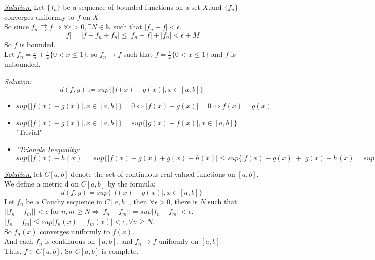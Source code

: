 \documentclass{book}
\begin{document}
\begin{tcolorbox}[enhanced,attach boxed title to top center={yshift=-3mm,yshifttext=-1mm},
colback=blue!5!white,colframe=blue!75!black,colbacktitle=red!80!black,
title=Exercise 60.5:,fonttitle=\bfseries,
boxed title style={size=small,colframe=red!50!black} ]
\textit{\color{blue}\underline{Solution:}}
Let $\{f_n\}$ be a sequence of bounded functions on a set $X$.and $\{f_n\}$
converges uniformly to $f$ on $X$\\
So since $f_n\rightrightarrows f\Rightarrow\forall\epsilon>0,\exists N\in\mathbb{N}$ such that $|f_n-f|<\epsilon$.\\
$$|f|=|f-f_n+f_n|\leq |f_n-f|+|f_n|<\epsilon+M$$
So $f$ is bounded.\\
\noindent{\color{black}\rule{\linewidth}{.3mm}}
Let $f_n=\frac{x}{n}+\frac{1}{x}\{0<x\leq 1\}$, so $f_n\rightarrow f$ such that $f=\frac{1}{x}\{0<x\leq 1\}$ and $f$ is unbounded.
\end{tcolorbox}
\begin{tcolorbox}[enhanced,attach boxed title to top center={yshift=-3mm,yshifttext=-1mm},
colback=blue!5!white,colframe=blue!75!black,colbacktitle=red!80!black,
title=Exercise 60.9:,fonttitle=\bfseries,
boxed title style={size=small,colframe=red!50!black} ]
\textit{\color{blue}\underline{Solution:}}
$$d(f,g):=sup\{|f(x)-g(x)|,x\in[a,b]\}$$
\begin{itemize}
\item $sup\{|f(x)-g(x)|,x\in[a,b]\}=0\iff |f(x)-g(x)|=0\iff f(x)=g(x)$
\item $sup\{|f(x)-g(x)|,x\in[a,b]\}=sup\{|g(x)-f(x)|,x\in[a,b]\}$ "Trivial"
\item {\color{red}\textit{"Triangle Inequality:}} $sup\{|f(x)-h(x)|=sup\{|f(x)-g(x)+g(x)-h(x)|\leq sup\{|f(x)-g(x)|+|g(x)-h(x)=sup\{|f(x)-g(x)|+sup\{|g(x)-h(x)|\}$
\end{itemize}
\end{tcolorbox}
\begin{tcolorbox}[enhanced,attach boxed title to top center={yshift=-3mm,yshifttext=-1mm},
colback=blue!5!white,colframe=blue!75!black,colbacktitle=red!80!black,
title=Exercise 60.10:,fonttitle=\bfseries,
boxed title style={size=small,colframe=red!50!black} ]
\textit{\color{blue}\underline{Solution:}}
let $C[a,b]$ denote the set of continuous real-valued functions
on $[a,b]$. We define a metric d on $C[a,b]$ by the formula:
$$d(f,g)=sup\{|f(x)-g(x)|,x\in[a,b]\}$$
Let $f_n$ be a Cauchy sequence in $C[a,b]$, then $\forall\epsilon>0$, there is $N$ such that $||f_n-f_m||<\epsilon$ for $n,m\geq N\Longrightarrow|f_n-f_m||=sup|f_n-f_m|<\epsilon$.\\
$|f_n-f_m|\leq sup|f_n(x)-f_m(x)|<\epsilon,\forall n\geq N$.\\
So $f_n(x)$ converges uniformly to $f(x)$.\\
And each $f_n$ is continuous on $[a,b]$, and $f_n\rightarrow f$ uniformly on $[a,b]$.\\
Thus, $f\in C[a,b]$. So $C[a,b]$ is complete.

\end{tcolorbox}
\end{document}
